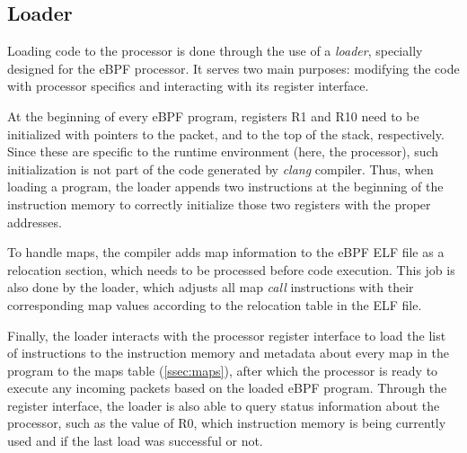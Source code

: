 
\subsection{Loader}
\label{ssec:loader}
Loading code to the processor is done through the use of a \textit{loader}, specially designed for the eBPF processor. It serves two main purposes: modifying the code with processor specifics and interacting with its register interface.

At the beginning of every eBPF program, registers R1 and R10 need to be initialized with pointers to the packet, and to the top of the stack, respectively. Since these are specific to the runtime environment (here, the processor), such initialization is not part of the code generated by \textit{clang} compiler. Thus, when loading a program, the loader appends two instructions at the beginning of the instruction memory to correctly initialize those two registers with the proper addresses. 

To handle maps, the compiler adds map information to the eBPF ELF file as a relocation section, which needs to be processed before code execution. This job is also done by the loader, which adjusts all map \textit{call} instructions with their corresponding map values according to the relocation table in the ELF file.

Finally, the loader interacts with the processor register interface to load the list of instructions to the instruction memory and metadata about every map in the program to the maps table (\textsection \ref{ssec:maps}), after which the processor is ready to execute any incoming packets based on the loaded eBPF program. Through the register interface, the loader is also able to query status information about the processor, such as the value of R0, which instruction memory is being currently used and if the last load was successful or not.

